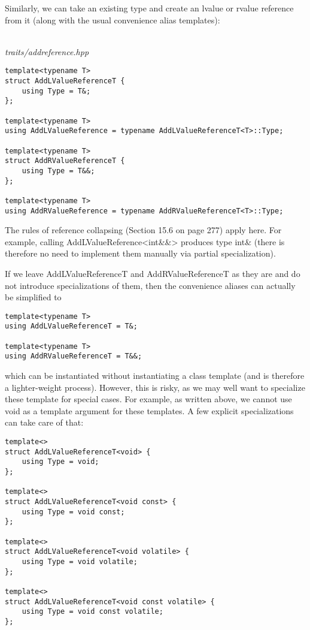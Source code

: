 Similarly, we can take an existing type and create an lvalue or rvalue reference from it (along with the usual convenience alias templates):

\hspace*{\fill} \\ %
\noindent
\textit{traits/addreference.hpp}
\begin{lstlisting}[style=styleCXX]
template<typename T>
struct AddLValueReferenceT {
	using Type = T&;
};

template<typename T>
using AddLValueReference = typename AddLValueReferenceT<T>::Type;

template<typename T>
struct AddRValueReferenceT {
	using Type = T&&;
};

template<typename T>
using AddRValueReference = typename AddRValueReferenceT<T>::Type;
\end{lstlisting}

The rules of reference collapsing (Section 15.6 on page 277) apply here. For example, calling AddLValueReference<int\&\&> produces type int\& (there is therefore no need to implement them manually via partial specialization).

If we leave AddLValueReferenceT and AddRValueReferenceT as they are and do not introduce specializations of them, then the convenience aliases can actually be simplified to

\begin{lstlisting}[style=styleCXX]
template<typename T>
using AddLValueReferenceT = T&;

template<typename T>
using AddRValueReferenceT = T&&;
\end{lstlisting}

which can be instantiated without instantiating a class template (and is therefore a lighter-weight process). However, this is risky, as we may well want to specialize these template for special cases. For example, as written above, we cannot use void as a template argument for these templates. A few explicit specializations can take care of that:

\begin{lstlisting}[style=styleCXX]
template<>
struct AddLValueReferenceT<void> {
	using Type = void;
};

template<>
struct AddLValueReferenceT<void const> {
	using Type = void const;
};

template<>
struct AddLValueReferenceT<void volatile> {
	using Type = void volatile;
};

template<>
struct AddLValueReferenceT<void const volatile> {
	using Type = void const volatile;
};
\end{lstlisting}

